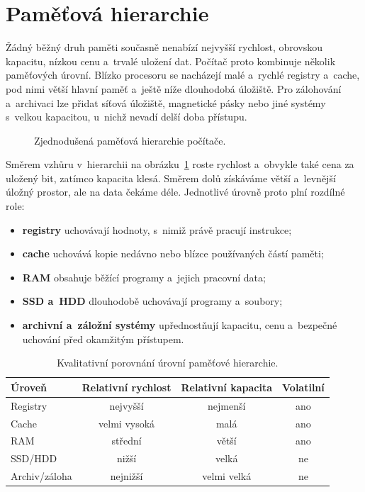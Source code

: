 \section{Paměťová hierarchie}\label{sec:hw-pametova-hierarchie}

Žádný běžný druh paměti současně nenabízí nejvyšší rychlost, obrovskou kapacitu, nízkou cenu a~trvalé uložení dat. Počítač proto kombinuje několik paměťových úrovní. Blízko procesoru se nacházejí malé a~rychlé registry a~cache, pod nimi větší hlavní paměť a~ještě níže dlouhodobá úložiště. Pro zálohování a~archivaci lze přidat síťová úložiště, magnetické pásky nebo jiné systémy s~velkou kapacitou, u~nichž nevadí delší doba přístupu.

\begin{figure}[ht]
    \centering
    
    \caption{Zjednodušená paměťová hierarchie počítače.}
    \label{fig:hw-pametova-hierarchie}
\end{figure}

Směrem vzhůru v~hierarchii na obrázku~\ref{fig:hw-pametova-hierarchie} roste rychlost a~obvykle také cena za uložený bit, zatímco kapacita klesá. Směrem dolů získáváme větší a~levnější úložný prostor, ale na data čekáme déle. Jednotlivé úrovně proto plní rozdílné role:
\begin{itemize}
    \item \textbf{registry} uchovávají hodnoty, s~nimiž právě pracují instrukce;
    \item \textbf{cache} uchovává kopie nedávno nebo blízce používaných částí paměti;
    \item \textbf{RAM} obsahuje běžící programy a~jejich pracovní data;
    \item \textbf{SSD a~HDD} dlouhodobě uchovávají programy a~soubory;
    \item \textbf{archivní a~záložní systémy} upřednostňují kapacitu, cenu a~bezpečné uchování před okamžitým přístupem.
\end{itemize}

\begin{table}[ht]
    \centering
    \begin{tabular}{|l|c|c|c|}
        \hline
        \textbf{Úroveň} & \textbf{Relativní rychlost} & \textbf{Relativní kapacita} & \textbf{Volatilní} \\ \hline
        Registry & nejvyšší & nejmenší & ano \\ \hline
        Cache & velmi vysoká & malá & ano \\ \hline
        RAM & střední & větší & ano \\ \hline
        SSD/HDD & nižší & velká & ne \\ \hline
        Archiv/záloha & nejnižší & velmi velká & ne \\ \hline
    \end{tabular}
    \caption{Kvalitativní porovnání úrovní paměťové hierarchie.}
    \label{tab:hw-pametova-hierarchie}
\end{table}

